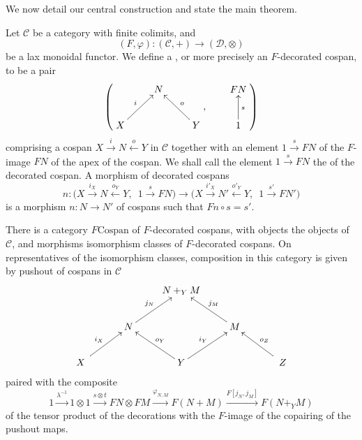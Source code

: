 We now detail our central construction and state the main theorem.
\begin{definition} \label{def:fcospans}
  Let $\mathcal C$ be a category with finite colimits, and
  \[
    (F,\varphi)\colon  (\mathcal C,+) \longrightarrow (\mathcal D, \otimes)
  \]
  be a lax monoidal functor. We define a , or more
  precisely an $F$-decorated cospan, to be a pair 
  \[
    \left(
    \begin{aligned}
      \xymatrix{
	& N \\  
	X \ar[ur]^{i} && Y \ar[ul]_{o}
      }
    \end{aligned}
    ,
    \qquad
    \begin{aligned}
      \xymatrix{
	FN \\
	1 \ar[u]_{s}
      }
    \end{aligned}
    \right)
  \]
  comprising a cospan $X \stackrel{i}\rightarrow N \stackrel{o}\leftarrow Y$ in
  $\mathcal C$ together with an element $1 \stackrel{s}\rightarrow FN$ of
  the $F$-image $FN$ of the apex of the cospan. We shall call the element $1
  \stackrel{s}\rightarrow FN$ the  of the decorated
  cospan. A morphism of decorated cospans 
  \[
    n\colon  \big(X \stackrel{i_X}\longrightarrow N \stackrel{o_Y}\longleftarrow
    Y,\enspace 1 \stackrel{s}\longrightarrow FN\big) \longrightarrow \big(X
    \stackrel{i'_X}\longrightarrow N' \stackrel{o'_Y}\longleftarrow Y,\enspace 1
    \stackrel{s'}\longrightarrow FN'\big)
  \]
  is a morphism $n\colon  N \to N'$ of cospans such that $Fn \circ s = s'$.
\end{definition}

\begin{proposition}
  There is a category $F\mathrm{Cospan}$ of $F$-decorated cospans, with objects
  the objects of $\mathcal C$, and morphisms isomorphism classes of
  $F$-decorated cospans. On representatives of the isomorphism classes,
  composition in this category is given by pushout of cospans in $\mathcal C$
  \[
    \xymatrix{
      && N+_YM \\
      & N \ar[ur]^{j_N} && M \ar[ul]_{j_M} \\
      \quad X \quad \ar[ur]^{i_X} && Y \ar[ul]_{o_Y} \ar[ur]^{i_Y} && \quad Z
      \quad \ar[ul]_{o_Z}
    }
  \]
  paired with the composite
  \[
    1 \stackrel{\lambda^{-1}}\longrightarrow 1 \otimes 1 \stackrel{s \otimes
    t}\longrightarrow FN \otimes FM \stackrel{\varphi_{N,M}}\longrightarrow
    F(N+M) \stackrel{F[j_N,j_M]}\longrightarrow F(N+_YM)
  \]
  of the tensor product of the decorations with the $F$-image of the copairing
  of the pushout maps.
\end{proposition}

